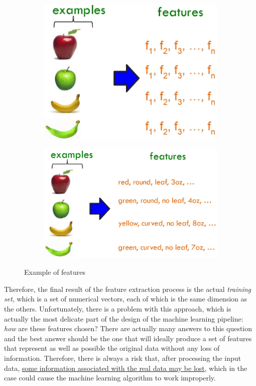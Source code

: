 \begin{figure}[h]
      \centering
      \begin{subfigure}{0.45\textwidth}
            \centering
            \includegraphics[width=\textwidth]{../img/Features_1}
      \end{subfigure}
      \hfill
      \begin{subfigure}{0.45\textwidth}
            \centering
            \includegraphics[width=\textwidth]{../img/Features_2}
      \end{subfigure}
      \caption{Example of features}
\end{figure}

\vspace{5mm}

Therefore, the final result of the feature extraction process is the
actual \emph{training set}, which is a set of numerical vectors, each of
which is the same dimension as the others. Unfortunately, there is a
problem with this approach, which is actually the most delicate part of
the design of the machine learning pipeline: \emph{how} are these
features chosen? There are actually many answers to this question and
the best answer should be the one that will ideally produce a set of
features that represent as well as possible the original data without
any loss of information. Therefore, there is always a risk that, after
processing the input data,
\underline{some information associated with the real data may be lost},
which in the case could cause the machine learning algorithm to work
improperly.